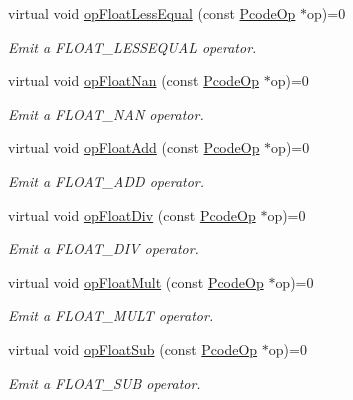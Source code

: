 \begin{DoxyCompactItemize}
virtual void \mbox{\hyperlink{class_print_language_a9450ff7a8ee019118079bd227af91483}{op\+Float\+Less\+Equal}} (const \mbox{\hyperlink{class_pcode_op}{Pcode\+Op}} $\ast$op)=0
\begin{DoxyCompactList}\small\item\em Emit a F\+L\+O\+A\+T\+\_\+\+L\+E\+S\+S\+E\+Q\+U\+AL operator. \end{DoxyCompactList}\item 
virtual void \mbox{\hyperlink{class_print_language_a96631272c629a096d9d7c30c340ffbd5}{op\+Float\+Nan}} (const \mbox{\hyperlink{class_pcode_op}{Pcode\+Op}} $\ast$op)=0
\begin{DoxyCompactList}\small\item\em Emit a F\+L\+O\+A\+T\+\_\+\+N\+AN operator. \end{DoxyCompactList}\item 
virtual void \mbox{\hyperlink{class_print_language_a71d89b7be2f9785be3599e7c27e322aa}{op\+Float\+Add}} (const \mbox{\hyperlink{class_pcode_op}{Pcode\+Op}} $\ast$op)=0
\begin{DoxyCompactList}\small\item\em Emit a F\+L\+O\+A\+T\+\_\+\+A\+DD operator. \end{DoxyCompactList}\item 
virtual void \mbox{\hyperlink{class_print_language_a78dabff7a3be91653fa6326e40232004}{op\+Float\+Div}} (const \mbox{\hyperlink{class_pcode_op}{Pcode\+Op}} $\ast$op)=0
\begin{DoxyCompactList}\small\item\em Emit a F\+L\+O\+A\+T\+\_\+\+D\+IV operator. \end{DoxyCompactList}\item 
virtual void \mbox{\hyperlink{class_print_language_aa2b82ec672aec190c8acc2f0068ed3b7}{op\+Float\+Mult}} (const \mbox{\hyperlink{class_pcode_op}{Pcode\+Op}} $\ast$op)=0
\begin{DoxyCompactList}\small\item\em Emit a F\+L\+O\+A\+T\+\_\+\+M\+U\+LT operator. \end{DoxyCompactList}\item 
virtual void \mbox{\hyperlink{class_print_language_a09e42786482d085bba0ec7b1bb982f37}{op\+Float\+Sub}} (const \mbox{\hyperlink{class_pcode_op}{Pcode\+Op}} $\ast$op)=0
\begin{DoxyCompactList}\small\item\em Emit a F\+L\+O\+A\+T\+\_\+\+S\+UB operator. \end{DoxyCompactList}\item 

\end{DoxyCompactItemize}
